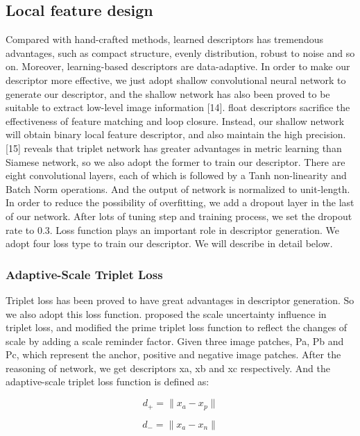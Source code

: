 \documentclass{svproc}
\begin{document}
\subsection{Local feature design } 
Compared with hand-crafted methods, learned descriptors has tremendous advantages, such as compact structure, evenly distribution, robust to noise and so on. Moreover, learning-based descriptors are data-adaptive. In order to make our descriptor more effective, we just adopt shallow convolutional neural network to generate our descriptor, and the shallow network has also been proved to be suitable to extract low-level image information [14]. float descriptors sacrifice the effectiveness of feature matching and loop closure. Instead, our shallow network will obtain binary local feature descriptor, and also maintain the high precision.
	[15] reveals that triplet network has greater advantages in metric learning than Siamese network, so we also adopt the former to train our descriptor. There are eight convolutional layers, each of which is followed by a Tanh non-linearity and Batch Norm operations. And the output of network is normalized to unit-length. In order to reduce the possibility of overfitting, we add a dropout layer in the last of our network. After lots of tuning step and training process, we set the dropout rate to 0.3.
	Loss function plays an important role in descriptor generation. We adopt four loss type to train our descriptor. We will describe in detail below.

\subsubsection{Adaptive-Scale Triplet Loss} 
Triplet loss has been proved to have great advantages in descriptor generation. So we also adopt this loss function. \cite{c28}proposed the scale uncertainty influence in triplet loss, and modified the prime triplet loss function to reflect the changes of scale by adding a scale reminder factor. Given three image patches, Pa, Pb and Pc, which represent the anchor, positive and negative image patches. After the reasoning of network, we get descriptors xa, xb and xc respectively. And the adaptive-scale triplet loss function is defined as:

\begin{equation}
d _{+} = \| x_{a} - x_{p}  \| 
\end{equation}

\begin{equation}
d _{-} = \| x_{a} - x_{n}  \| 
\end{equation}
\end{document}
